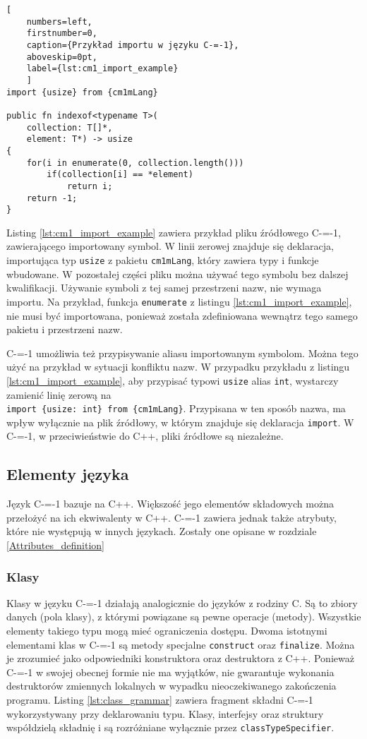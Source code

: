 \begin{lstlisting}[
	numbers=left,
	firstnumber=0,
	caption={Przykład importu w języku C-=-1},
	aboveskip=0pt,
	label={lst:cm1_import_example}
	]
import {usize} from {cm1mLang}

public fn indexof<typename T>(
	collection: T[]*,
	element: T*) -> usize
{
	for(i in enumerate(0, collection.length()))
		if(collection[i] == *element)
			return i;
	return -1;
}
\end{lstlisting}

Listing \ref{lst:cm1_import_example} zawiera przykład pliku źródłowego C-=-1, zawierającego importowany symbol.
W linii zerowej znajduje się deklaracja, importująca typ \lstinline{usize} z pakietu \lstinline{cm1mLang}, który zawiera typy i funkcje wbudowane.
W pozostałej części pliku można używać tego symbolu bez dalszej kwalifikacji.
Używanie symboli z tej samej przestrzeni nazw, nie wymaga importu.
Na przykład, funkcja \lstinline{enumerate} z listingu \ref{lst:cm1_import_example}, nie musi być importowana, ponieważ została zdefiniowana wewnątrz tego samego pakietu i przestrzeni nazw.

C-=-1 umożliwia też przypisywanie aliasu importowanym symbolom.
Można tego użyć na przykład w sytuacji konfliktu nazw.
W przypadku przykładu z listingu \ref{lst:cm1_import_example}, aby przypisać typowi \lstinline{usize} alias \lstinline{int}, wystarczy zamienić linię zerową na\\ \lstinline|import {usize: int} from {cm1mLang}|.
Przypisana w ten sposób nazwa, ma wpływ wyłącznie na plik źródłowy, w którym znajduje się deklaracja \lstinline{import}.
W C-=-1, w przeciwieństwie do C++, pliki źródłowe są niezależne.

\subsection{Elementy języka}
\label{elementy_jezyka}

Język C-=-1 bazuje na C++.
Większość jego elementów składowych można przełożyć na ich ekwiwalenty w C++.
C-=-1 zawiera jednak także atrybuty, które nie występują w innych językach.
Zostały one opisane w rozdziale \ref{Attributes_definition}

\subsubsection{Klasy}
\label{classes_definition}
Klasy w języku C-=-1 działają analogicznie do języków z rodziny C.
Są to zbiory danych (pola klasy), z którymi powiązane są pewne operacje (metody).
Wszystkie elementy takiego typu mogą mieć ograniczenia dostępu.
Dwoma istotnymi elementami klas w C-=-1 są metody specjalne \lstinline{construct} oraz \lstinline{finalize}.
Można je zrozumieć jako odpowiedniki konstruktora oraz destruktora z C++.
Ponieważ C-=-1 w swojej obecnej formie nie ma wyjątków, nie gwarantuje wykonania destruktorów zmiennych lokalnych w wypadku nieoczekiwanego zakończenia programu.
Listing \ref{lst:class_grammar} zawiera fragment składni C-=-1 wykorzystywany przy deklarowaniu typu.
Klasy, interfejsy oraz struktury współdzielą składnię i są rozróżniane wyłącznie przez \lstinline{classTypeSpecifier}.

